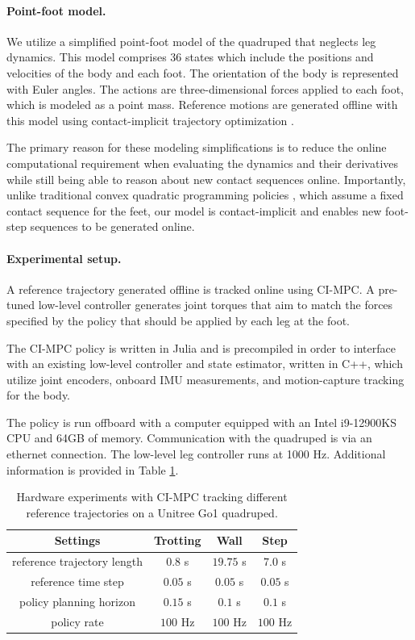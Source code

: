 \paragraph{Point-foot model.}
We utilize a simplified point-foot model of the quadruped that neglects leg dynamics. This model comprises 36 states which include the positions and velocities of the body and each foot. The orientation of the body is represented with Euler angles. The actions are three-dimensional forces applied to each foot, which is modeled as a point mass. Reference motions are generated offline with this model using contact-implicit trajectory optimization \cite{manchester2020variational}.

The primary reason for these modeling simplifications is to reduce the online computational requirement when evaluating the dynamics and their derivatives while still being able to reason about new contact sequences online. Importantly, unlike traditional convex quadratic programming policies \cite{bledt2017policy}, which assume a fixed contact sequence for the feet, our model is contact-implicit and enables new foot-step sequences to be generated online. 

\paragraph{Experimental setup.} 
A reference trajectory generated offline is tracked online using CI-MPC. A pre-tuned low-level controller generates joint torques that aim to match the forces specified by the policy that should be applied by each leg at the foot.

The CI-MPC policy is written in Julia and is precompiled in order to interface with an existing low-level controller and state estimator, written in C++, which utilize joint encoders, onboard IMU measurements, and motion-capture tracking for the body.

The policy is run offboard with a computer equipped with an Intel i9-12900KS CPU and 64GB of memory. Communication with the quadruped is via an ethernet connection. The low-level leg controller runs at 1000 Hz. Additional information is provided in Table \ref{cipc_hardware_timing_table}.

\begin{table}[H]
	\centering
	\caption[Unitree Go1 quadruped hardware experiment details]{Hardware experiments with CI-MPC tracking different reference trajectories on a Unitree Go1 quadruped.}
	\begin{tabular}{c c c c}
		\toprule
		\textbf{Settings}  & \textbf{Trotting} & \textbf{Wall} & \textbf{Step}\\
		\toprule
		reference trajectory length & $0.8$ s & $19.75$ s & $7.0$ s \\
		reference time step & $0.05$ s & $0.05$ s & $0.05$ s\\
		policy planning horizon & $0.15$ s & $0.1$ s  & $0.1$ s\\
		policy rate & $100$ Hz & $100$ Hz & $100$ Hz\\
		\toprule
	\end{tabular}
	\label{cipc_hardware_timing_table}
\end{table}

